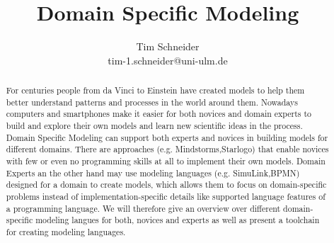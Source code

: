 \documentclass[runningheads,a4paper]{llncs}
\begin{document}
\mainmatter  %

\title{Domain Specific Modeling}



\author{Tim Schneider\\ tim-1.schneider@uni-ulm.de}


\maketitle


\begin{abstract}
For centuries people from da Vinci to Einstein have created models to help them better 
understand patterns and processes in the world around them. 
Nowadays computers and smartphones make it easier for both novices and domain experts to build 
and explore their own models and learn new scientific ideas in the process.
Domain Specific Modeling can support both experts and novices in building models for different domains.
There are approaches (e.g. Mindstorms,Starlogo) that enable novices with few or even no programming 
skills at all to implement their own models.
Domain Experts an the other hand may use modeling languages (e.g. SimuLink,BPMN) designed for a domain to create models, 
which allows them to focus on domain-specific problems instead of implementation-specific details like supported 
language features of a programming language.
We will therefore give an overview over different domain-specific modeling langues for both, novices and experts
as well as present a toolchain for creating modeling languages. 
\end{abstract}
\end{document}
